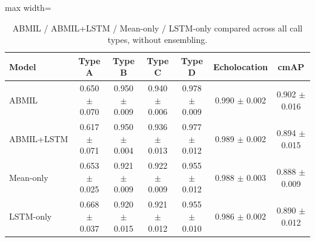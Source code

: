 \begin{table}[htbp]
\centering
\caption{ABMIL / ABMIL+LSTM / Mean-only / LSTM-only compared across all call types, without ensembling.}
\label{tab:architecture_label_comparison}
\begin{adjustbox}{max width=\textwidth}
\begin{tabular}{l ccccc c}
\toprule
Model & Type A & Type B & Type C & Type D & Echolocation & cmAP \\
\midrule
ABMIL & 0.650 $\pm$ 0.070 & 0.950 $\pm$ 0.009 & 0.940 $\pm$ 0.006 & 0.978 $\pm$ 0.009 & 0.990 $\pm$ 0.002 & 0.902 $\pm$ 0.016 \\
ABMIL+LSTM & 0.617 $\pm$ 0.071 & 0.950 $\pm$ 0.004 & 0.936 $\pm$ 0.013 & 0.977 $\pm$ 0.012 & 0.989 $\pm$ 0.002 & 0.894 $\pm$ 0.015 \\
Mean-only & 0.653 $\pm$ 0.025 & 0.921 $\pm$ 0.009 & 0.922 $\pm$ 0.009 & 0.955 $\pm$ 0.012 & 0.988 $\pm$ 0.003 & 0.888 $\pm$ 0.009 \\
LSTM-only & 0.668 $\pm$ 0.037 & 0.920 $\pm$ 0.015 & 0.921 $\pm$ 0.012 & 0.955 $\pm$ 0.010 & 0.986 $\pm$ 0.002 & 0.890 $\pm$ 0.012 \\
\bottomrule
\end{tabular}
\end{adjustbox}
\end{table}